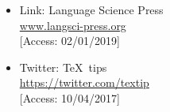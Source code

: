 \documentclass[a4paper,10pt,handout]{beamer}
\begin{document}
\begin{frame}[allowframebreaks]
{\begin{itemize}

		\item Link: Language Science Press\\
		\url{www.langsci-press.org}\\
		{[}Access: 02/01/2019]		

		\item Twitter: \TeX\ tips\\
		\url{https://twitter.com/textip} \\
		{[}Access: 10/04/2017]


%
%		
%		
%		
%		
%		


%


\end{itemize}}
\end{frame}
\end{document}
